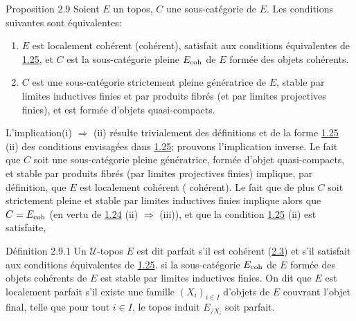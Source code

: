 \documentclass[10pt]{../fichiers-configuration-latex/smfart}
\begin{document}
\begin{enonce*}{Proposition 2.9}
Soient $E$ un topos, $C$ une sous-catégorie de $E$. Les conditions
suivantes sont équivalentes:
\begin{enumerate}
\renewcommand{\theenumi}{\roman{enumi}}
\renewcommand{\labelenumi}{(\theenumi)}
\item $E$ est localement cohérent (\resp cohérent), satisfait aux
  conditions équivalentes de \hyperref[VI.cor1.25]{1.25}, et $C$ est la sous-catégorie
  pleine $E_{\mathrm{coh}}$ de $E$ formée des objets cohérents.

\item $C$ est une sous-catégorie strictement pleine génératrice de
  $E$, stable par limites inductives finies et par produits fibrés
  (\resp et par limites projectives finies), et est formée d'objets
  quasi-compacts.
\end{enumerate}
\end{enonce*}

L'implication\pageoriginale (i) $\Rightarrow$ (ii) résulte trivialement des
définitions et de la forme \hyperref[VI.cor1.25]{1.25} (ii) des conditions envisagées dans
\hyperref[VI.cor1.25]{1.25}; prouvons l'implication inverse. Le fait que $C$ soit une
sous-catégorie pleine génératrice, formée d'objet quasi-compacts, et
stable par produits fibrés (\resp par limites projectives finies)
implique, par définition, que $E$ est localement cohérent (\resp
cohérent). Le fait que de plus $C$ soit strictement pleine et stable
par limites inductives finies implique alors que $C = E_{\mathrm{coh}}$ (en
vertu de \hyperref[VI.cor1.24]{1.24} (ii) $\Rightarrow$ (iii)), et que la condition \hyperref[VI.cor1.25]{1.25}
(ii) est satisfaite, \cqfd

\begin{enonce*}{Définition 2.9.1}
Un $𝒰$-topos $E$ est dit parfait s'il est cohérent (\hyperref[VI.def2.3]{2.3}) et s'il
satisfait aux conditions équivalentes de \hyperref[VI.cor1.25]{1.25}. \ie si la
sous-catégorie $E_{\mathrm{coh}}$ de $E$ formée des objets cohérents de $E$ est
stable par limites inductives finies. On dit que $E$ est localement
parfait s'il existe une famille $(X_i)_{i \in I}$ d'objets de $E$
couvrant l'objet final, telle que pour tout $i \in I$, le topos induit
$E_{/X_i}$ soit parfait.
\end{enonce*}

\setcounter{subsection}{9}
\setcounter{subsubsection}{1}
\subsubsection{}
\end{document}
